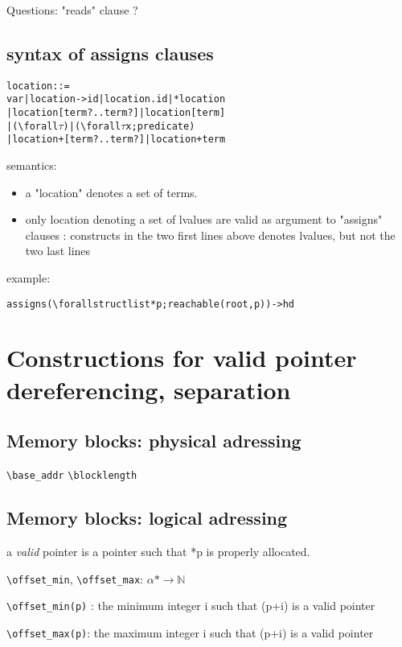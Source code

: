 \documentclass{article}
\newcommand{\Forall}{\texttt{{\textbackslash}forall}}
\newcommand{\offsetmin}{\texttt{{\textbackslash}offset\_min}}
\newcommand{\offsetmax}{\texttt{{\textbackslash}offset\_max}}
\newcommand{\N}{\ensuremath{\mathbb{N}}}
\newcommand{\ra}{\ensuremath{\rightarrow}}
\begin{document}
Questions: "reads" clause ?

\subsection{syntax of assigns clauses}

\begin{alltt}
  location ::=
       var | location->id | location.id | *location
       | location[term ? .. term?] | location[term]
       |  (\Forall \(\tau\)) | (\Forall \(\tau\) x ; predicate)
       |  location + [ term? .. term? ] | location + term
\end{alltt}

semantics:
\begin{itemize}
\item a "location" denotes a set of terms.
\item only location denoting a set of lvalues are valid as argument to
  "assigns" clauses : constructs in the two first lines above denotes
  lvalues, but not the two last lines
\end{itemize}

example:

\begin{alltt}
  assigns  (\Forall struct list *p ; reachable(root,p)) -> hd
\end{alltt}

\section{Constructions for valid pointer dereferencing, separation}

\subsection{Memory blocks: physical adressing}

\verb|\base_addr|
\verb|\blocklength|


\subsection{Memory blocks: logical adressing}

a \emph{valid} pointer is a pointer such that *p is properly
allocated.

\offsetmin, \offsetmax : $\alpha * \ra \N$

\verb|\offset_min(p)| : the minimum integer i such that (p+i) is a valid
pointer

\verb|\offset_max(p)|: the maximum integer i such that (p+i) is a valid
pointer
\end{document}
